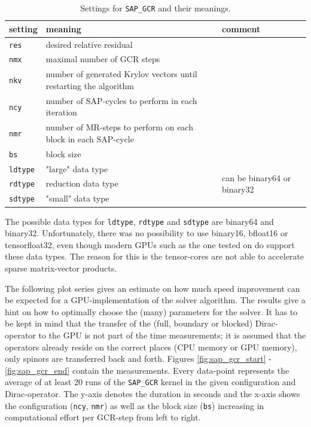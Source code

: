 \documentclass{article}
\theoremstyle{plain} %
\theoremstyle{convention} %
\theoremstyle{remark} %
\def\code#1{\texttt{#1}}
\numberwithin{equation}{section}
\begin{document}
\begin{table}[H]
\centering
    \begin{tabular}{ |p{1.5cm}|p{6cm}|p{4.5cm}|  }
        \hline
        setting & meaning & comment \\
        \hline\hline
        \code{res}  & desired relative residual & \\
        \hline
        \code{nmx}  & maximal number of GCR steps & \\
        \hline
        \code{nkv}  & number of generated Krylov vectors until restarting the algorithm & \\
        \hline
        \code{ncy}  & number of SAP-cycles to perform in each iteration & \\
        \hline
        \code{nmr}  & number of MR-steps to perform on each block in each SAP-cycle & \\
        \hline
        \code{bs}   & block size & \\
        \hline
        \code{ldtype}  & "large" data type & \multirow{3}{*}{can be binary64 or binary32}  \\
        \cline{0-1}
        \code{rdtype}  & reduction data type & \\
        \cline{0-1}
        \code{sdtype}  & "small" data type & \\
        \hline
    \end{tabular}
    \caption{Settings for \code{SAP\_GCR} and their meanings.}
    \label{tab:sap_gcr_settings}
\end{table}

The possible data types for \code{ldtype}, \code{rdtype} and \code{sdtype} are \gls{binary64} and \gls{binary32}. Unfortunately, there was no possibility to use \gls{binary16}, \gls{bfloat16} or \gls{tensorfloat32}, even though modern GPUs such as the one tested on do support these data types. The reason for this is the tensor-cores are not able to accelerate sparse matrix-vector products.


The following plot series gives an estimate on how much speed improvement can be expected for a GPU-implementation of the solver algorithm. The results give a hint on how to optimally choose the (many) parameters for the solver. It has to be kept in mind that the transfer of the (full, boundary or blocked) Dirac-operator to the GPU is not part of the time measurements; it is assumed that the operators already reside on the correct places (CPU memory or GPU memory), only spinors are transferred back and forth. Figures \ref{fig:sap_gcr_start} - \ref{fig:sap_gcr_end} contain the measurements. Every data-point represents the average of at least \num{20} runs of the \code{SAP\_GCR} kernel in the given configuration and Dirac-operator. The y-axis denotes the duration in seconds and the x-axis shows the configuration (\code{ncy}, \code{nmr}) as well as the block size (\code{bs}) increasing in computational effort per GCR-step from left to right.
\end{document}
